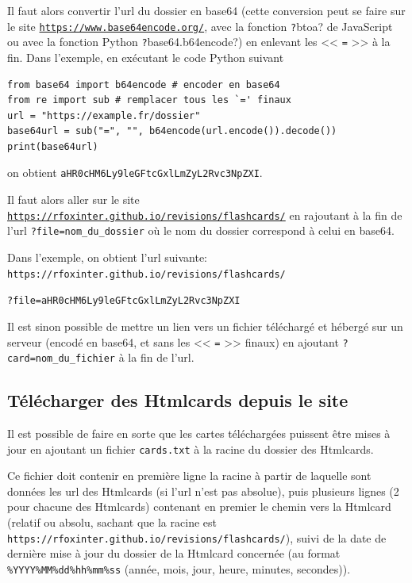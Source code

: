 \documentclass[a4paper,12pt]{article}
\begin{document}
Il faut alors convertir l'url du dossier en base64 (cette conversion peut se faire sur le site \href{https://www.base64encode.org/}{\texttt{https://www.base64encode.org/}}, avec la fonction \texttt?btoa? de JavaScript ou avec la  fonction Python \texttt?base64.b64encode?) en enlevant les << \texttt{=} >> à la fin. Dans l'exemple, en exécutant le code Python suivant
\vspace{-\abovedisplayskip}\begin{verbatim}
from base64 import b64encode # encoder en base64
from re import sub # remplacer tous les `=' finaux
url = "https://example.fr/dossier"
base64url = sub("=", "", b64encode(url.encode()).decode())
print(base64url)
\end{verbatim}
\vspace{-\belowdisplayskip}

on obtient \texttt{aHR0cHM6Ly9leGFtcGxlLmZyL2Rvc3NpZXI}.

Il faut alors aller sur le site \href{https://rfoxinter.github.io/revisions/flashcards/}{\texttt{https://rfoxinter.github.io/revisions/flashcards/}} en rajoutant à la fin de l'url \texttt{?file=nom\_du\_dossier} où le nom du dossier correspond à celui en base64.

Dans l'exemple, on obtient l'url suivante:\\\texttt{https://rfoxinter.github.io/revisions/flashcards/}

\hfill\texttt{?file=aHR0cHM6Ly9leGFtcGxlLmZyL2Rvc3NpZXI}

Il est sinon possible de mettre un lien vers un fichier téléchargé et hébergé sur un serveur (encodé en base64, et sans les << \texttt{=} >> finaux) en ajoutant \texttt{?card=nom\_du\_fichier} à la fin de l'url.
\subsection{Télécharger des Htmlcards depuis le site}
Il est possible de faire en sorte que les cartes téléchargées puissent être mises à jour en ajoutant un fichier \texttt{cards.txt} à la racine du dossier des Htmlcards.

Ce fichier doit contenir en première ligne la racine à partir de laquelle sont données les url des Htmlcards (si l'url n'est pas absolue), puis plusieurs lignes (2 pour chacune des Htmlcards) contenant en premier le chemin vers la Htmlcard (relatif ou absolu, sachant que la racine est \texttt{https://rfoxinter.github.io/revisions/flashcards/}), suivi de la date de dernière mise à jour du dossier de la Htmlcard concernée (au format \texttt{\%YYYY\%MM\%dd\%hh\%mm\%ss} (année, mois, jour, heure, minutes, secondes)).
\end{document}
